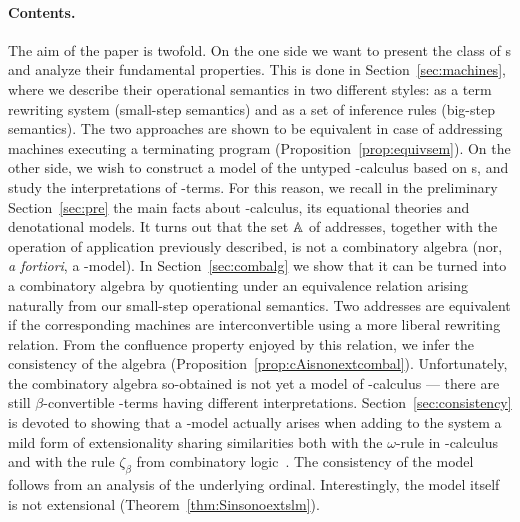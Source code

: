 \paragraph{Contents.} The aim of the paper is twofold.
On the one side we want to present the class of \am s and analyze their fundamental properties. This is done in Section~\ref{sec:machines}, where we describe their  operational semantics in two different styles: as a term rewriting system (small-step semantics) and as a set of inference rules (big-step semantics). The two approaches are shown to be equivalent in case of addressing machines executing a terminating program (Proposition~\ref{prop:equivsem}).
On the other side, we wish to construct a model of the untyped \lam-calculus based on \am s, and study the interpretations of \lam-terms.
For this reason, we recall in the preliminary Section~\ref{sec:pre} the main facts about \lam-calculus, its equational theories and denotational models.
It turns out that the set $\mathbb{A}$ of addresses, together with the operation of application previously described, is not a combinatory algebra (nor, \emph{a fortiori}, a \lam-model). In Section~\ref{sec:combalg} we show that it can be turned into a combinatory algebra by quotienting under an equivalence relation arising naturally from our small-step operational semantics. Two addresses are equivalent if the corresponding machines are interconvertible using a more liberal rewriting relation. From the confluence property enjoyed by this relation, we infer the consistency of the algebra (Proposition~\ref{prop:cAisnonextcombal}).
Unfortunately, the combinatory algebra so-obtained is not yet a model of \lam-calculus --- there are still $\beta$-convertible \lam-terms having different interpretations. %
Section~\ref{sec:consistency} is devoted to showing that a \lam-model actually arises when adding to the system a mild form of extensionality sharing similarities both with the $\omega$-rule in \lam-calculus~\cite{BarendregtTh} and with the rule $\zeta_\beta$ from combinatory logic~\cite{HindleyS86}. The consistency of the model follows from an analysis of the underlying ordinal.
Interestingly, the model itself is not extensional (Theorem~\ref{thm:Sinsonoextslm}).



